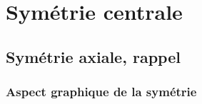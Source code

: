\documentclass[a4paper,10pt]{report}
\begin{document}

\newpage
\setcounter{chapter}{3}
\chapter{Symétrie centrale}

\vspace{-2mm}
\section{Symétrie axiale, rappel}

\vspace{-2mm}
\subsection{Aspect graphique de la symétrie}
\end{document}
